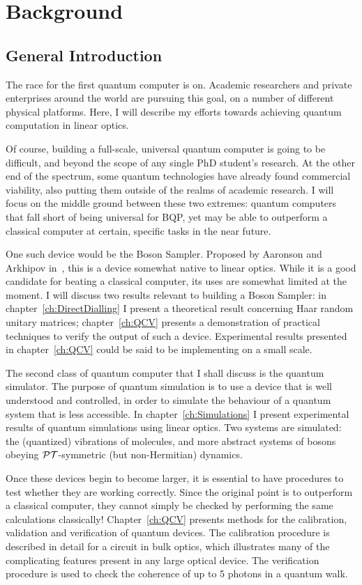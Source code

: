 \chapter{Background}
\label{ch:Introduction}
\section{General Introduction}
\label{sec:science}
The race for the first quantum computer is on. Academic researchers and private
enterprises around the world are pursuing this goal, on a number of different
physical platforms. Here, I will describe my efforts towards achieving quantum
computation in linear optics.

Of course, building a full-scale, universal quantum computer is going to be
difficult, and beyond the scope of any single PhD student's research. At the
other end of the spectrum, some quantum technologies have already found
commercial viability, also putting them outside of the realms of academic
research. I will focus on the middle ground between these two extremes: quantum
computers that fall short of being universal for BQP, yet may be able to
outperform a classical computer at certain, specific tasks in the near future.

One such device would be the Boson Sampler. Proposed by Aaronson and Arkhipov
in~\cite{bosonsampling}, this is a device somewhat native to linear optics.
While it is
a good candidate for beating a classical computer, its uses are somewhat limited
at the moment. I will discuss two results relevant to building a Boson Sampler:
in chapter~\ref{ch:DirectDialling} I present a theoretical result concerning
Haar random unitary matrices; chapter~\ref{ch:QCV} presents a demonstration of
practical techniques to verify the output of such a device. Experimental results
presented in chapter~\ref{ch:QCV} could be said to be implementing
\bosonsampling{ }on a small scale.

The second class of quantum computer that I shall discuss is the quantum
simulator. The purpose of quantum simulation is to use a device that is well
understood and controlled, in order to simulate the behaviour of a quantum
system that is less accessible. In chapter~\ref{ch:Simulations} I present
experimental results of quantum simulations using linear optics. Two systems are
simulated: the (quantized) vibrations of molecules, and more abstract systems of
bosons obeying \(\mathcal{PT}\)-symmetric (but non-Hermitian) dynamics.

Once these devices begin to become larger, it is essential to have procedures to
test whether they are working correctly. Since the original point is to
outperform a classical computer, they cannot simply be checked by performing the
same calculations classically! Chapter~\ref{ch:QCV} presents methods for the
calibration, validation and verification of quantum devices. The calibration
procedure is described in detail for a circuit in bulk optics, which illustrates
many of the complicating features present in any large optical device. The
verification procedure is used to check the coherence  of up to 5 photons in a quantum walk.

